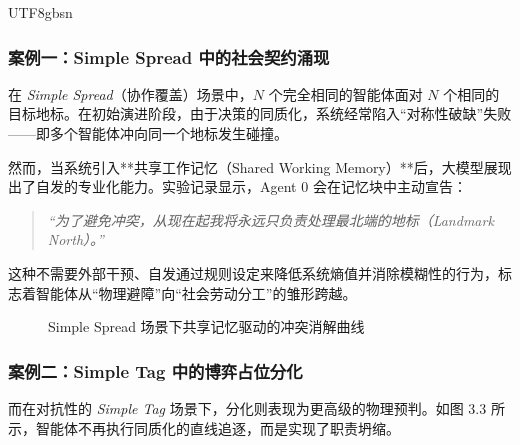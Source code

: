 \documentclass[11pt,a4paper]{article}
\begin{document}
\begin{CJK*}{UTF8}{gbsn}
\subsubsection{案例一：Simple Spread 中的社会契约涌现}
在 \textit{Simple Spread}（协作覆盖）场景中，$N$ 个完全相同的智能体面对 $N$ 个相同的目标地标。在初始演进阶段，由于决策的同质化，系统经常陷入“对称性破缺”失败——即多个智能体冲向同一个地标发生碰撞。

然而，当系统引入**共享工作记忆（Shared Working Memory）**后，大模型展现出了自发的专业化能力。实验记录显示，Agent 0 会在记忆块中主动宣告：
\begin{quote}
    \textit{“为了避免冲突，从现在起我将永远只负责处理最北端的地标（Landmark North）。”}
\end{quote}
这种不需要外部干预、自发通过规则设定来降低系统熵值并消除模糊性的行为，标志着智能体从“物理避障”向“社会劳动分工”的雏形跨越。

\begin{figure}[h!]
\centering
{}
\caption{Simple Spread 场景下共享记忆驱动的冲突消解曲线}
\end{figure}



\subsubsection{案例二：Simple Tag 中的博弈占位分化}
而在对抗性的 \textit{Simple Tag} 场景下，分化则表现为更高级的物理预判。如图 3.3 所示，智能体不再执行同质化的直线追逐，而是实现了职责坍缩。


\end{CJK*}
\end{document}
